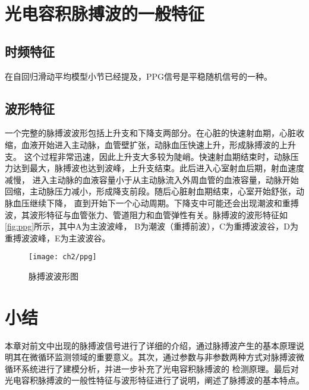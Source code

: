 \section{光电容积脉搏波的一般特征}
\subsection{时频特征}
在自回归滑动平均模型小节已经提及，PPG信号是平稳随机信号的一种。
\subsection{波形特征}
一个完整的脉搏波波形包括上升支和下降支两部分。在心脏的快速射血期，心脏收缩，血液开始进入主动脉，血管壁扩张，动脉血压快速上升，形成脉搏波的上升支。
这个过程非常迅速，因此上升支大多较为陡峭。快速射血期结束时，动脉压力达到最大，脉搏波也达到波峰，上升支结束。此后进入心室射血后期，射血速度减慢，
进入主动脉的血液容量小于从主动脉流入外周血管的血液容量，动脉开始回缩，主动脉压力减小，形成降支前段。随后心脏射血期结束，心室开始舒张，动脉血压继续下降，
直到开始下一个心动周期。下降支中可能还会出现潮波和重搏波，其波形特征与血管张力、管道阻力和血管弹性有关。脉搏波的波形特征如\autoref{fig:ppg}所示，其中A为主波波峰，
B为潮波（重搏前波），C为重搏波波谷，D为重搏波波峰，E为主波波谷。
\begin{figure}[htbp]
\centering
\texttt{[image: ch2/ppg]} 
\caption{\label{fig:ppg}脉搏波波形图}
\end{figure}

\section{小结}
本章对前文中出现的脉搏波信号进行了详细的介绍，通过脉搏波产生的基本原理说明其在微循环监测领域的重要意义。其次，通过参数与非参数两种方式对脉搏波微循环系统进行了建模分析，并进一步补充了光电容积脉搏波的
检测原理。最后对光电容积脉搏波的一般性特征与波形特征进行了说明，阐述了脉搏波的基本特点。